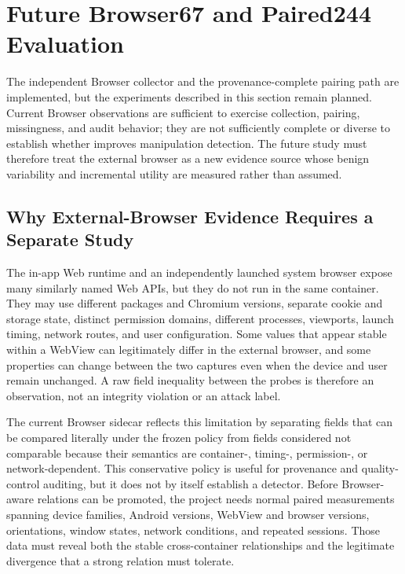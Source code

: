 \section{Future Browser67 and Paired244 Evaluation}
\label{sec:browser-future}



The independent Browser collector and the provenance-complete pairing path are implemented, but the experiments described in this section remain planned. Current Browser observations are sufficient to exercise collection, pairing, missingness, and audit behavior; they are not sufficiently complete or diverse to establish whether \browserfp improves manipulation detection. The future study must therefore treat the external browser as a new evidence source whose benign variability and incremental utility are measured rather than assumed.

\subsection{Why External-Browser Evidence Requires a Separate Study}

The in-app Web runtime and an independently launched system browser expose many similarly named Web APIs, but they do not run in the same container. They may use different packages and Chromium versions, separate cookie and storage state, distinct permission domains, different processes, viewports, launch timing, network routes, and user configuration. Some values that appear stable within a WebView can legitimately differ in the external browser, and some properties can change between the two captures even when the device and user remain unchanged. A raw field inequality between the probes is therefore an observation, not an integrity violation or an attack label.

The current Browser sidecar reflects this limitation by separating fields that can be compared literally under the frozen policy from fields considered not comparable because their semantics are container-, timing-, permission-, or network-dependent. This conservative policy is useful for provenance and quality-control auditing, but it does not by itself establish a detector. Before Browser-aware relations can be promoted, the project needs normal paired measurements spanning device families, Android versions, WebView and browser versions, orientations, window states, network conditions, and repeated sessions. Those data must reveal both the stable cross-container relationships and the legitimate divergence that a strong relation must tolerate.

